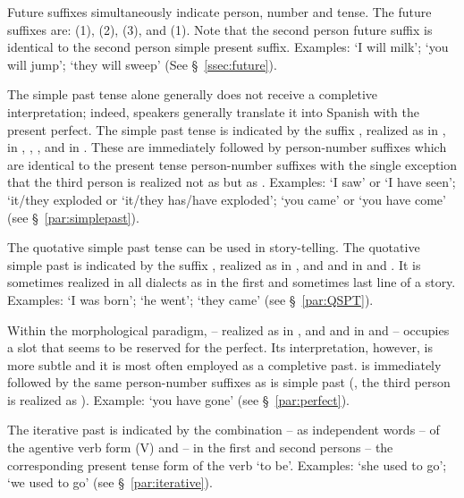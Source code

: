 Future suffixes simultaneously indicate person, number and tense. The future suffixes are:  (1),  (2),  (3), and  (1). Note that the second person future suffix is identical to the second person simple present suffix. Examples:  `I will milk';  `you will jump';  `they will sweep' (See \S~\ref{ssec:future}).

The simple past tense alone generally does not receive a completive interpretation; indeed, speakers generally translate it into Spanish with the present perfect. The simple past tense is indicated by the suffix , realized as  in \AMV{},  in \ACH{}, \LT{}, \SP{}, and  in \CH{}. These are immediately followed by person-number suffixes which are identical to the present tense person-number suffixes with the single exception that the third person is realized not as  but as \phono{-\uo}. Examples:  `I saw' or `I have seen';  `it/they exploded or `it/they has/have exploded'; `you came' or `you have come'  (see \S~\ref{par:simplepast}).

The quotative simple past tense can be used in story-telling. The quotative simple past is indicated by the suffix , realized as  in \ACH{}, \AMV{} and \SP{} and  in \CH{} and \LT{}. It is sometimes realized in all dialects as  in the first and sometimes last line of a story. Examples:  `I was born';  `he went';  `they came' (see \S~\ref{par:QSPT}).

Within the morphological paradigm,  -- realized as  in \ACH{}, \AMV{} and \SP{} and  in \CH{} and \LT{} -- occupies a slot that seems to be reserved for the perfect. Its interpretation, however, is more subtle and it is most often employed as a completive past.  is immediately followed by the same person-number suffixes as is simple past (\ie{}, the third person is realized as \phono{-\uo}). Example:  `you have gone' (see \S~\ref{par:perfect}).

The iterative past is indicated by the combination -- as independent words -- of the agentive verb form (V) and -- in the first and second persons -- the corresponding present tense form of the verb  `to be'. Examples:  `she used to go';  `we used to go' (see \S~\ref{par:iterative}).

